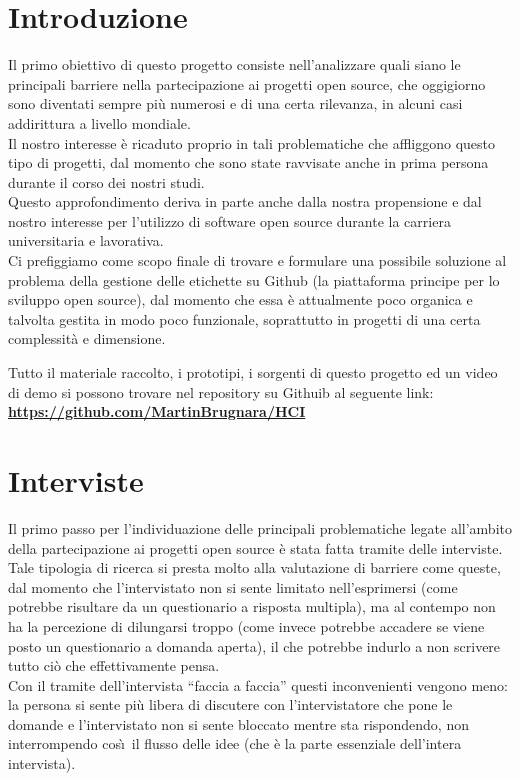 \documentclass[12pt]{article} %
\begin{document}
\section{Introduzione}
Il primo obiettivo di questo progetto consiste nell'analizzare quali siano le principali barriere nella partecipazione ai progetti open source, che oggigiorno sono diventati sempre pi\`u numerosi e di una certa rilevanza, in alcuni casi addirittura a livello mondiale.\\
Il nostro interesse \`e ricaduto proprio in tali problematiche che affliggono questo tipo di progetti, dal momento che sono state ravvisate anche in prima persona durante il corso dei nostri studi.\\
Questo approfondimento deriva in parte anche dalla nostra propensione e dal nostro interesse per l'utilizzo di software open source durante la carriera universitaria e lavorativa.\\
Ci prefiggiamo come scopo finale di trovare e formulare una possibile soluzione al problema della gestione delle etichette su Github (la piattaforma principe per lo sviluppo open source), dal momento che essa \`e attualmente poco organica e talvolta gestita in modo poco funzionale, soprattutto in progetti di una certa complessit\`a e dimensione.\\
\vfill
\begin{center}
Tutto il materiale raccolto, i prototipi, i sorgenti di questo progetto ed un video di demo si possono trovare nel repository su Githuib al seguente link:\\
\textbf{\url{https://github.com/MartinBrugnara/HCI}}
\end{center}

\newpage

\section{Interviste}
Il primo passo per l'individuazione delle principali problematiche legate all'ambito della partecipazione ai progetti open source \`e stata fatta tramite delle interviste. Tale tipologia di ricerca si presta molto alla valutazione di barriere come queste, dal momento che l'intervistato non si sente limitato nell'esprimersi (come potrebbe risultare da un questionario a risposta multipla), ma al contempo non ha la percezione di dilungarsi troppo (come invece potrebbe accadere se viene posto un questionario a domanda aperta), il che potrebbe indurlo a non scrivere tutto ci\`o che effettivamente pensa.\\
Con il tramite dell'intervista ``faccia a faccia'' questi inconvenienti vengono meno: la persona si sente pi\`u libera di discutere con l'intervistatore che pone le domande e l'intervistato non si sente bloccato mentre sta rispondendo, non interrompendo cos\`\i\ il flusso delle idee (che \`e la parte essenziale dell'intera intervista).\\
\end{document}
